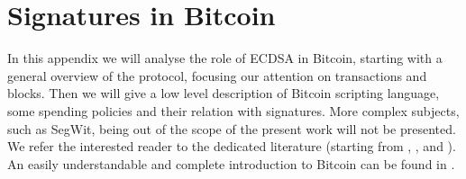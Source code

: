 \chapter{Signatures in Bitcoin}
\label{app:A}
In this appendix we will analyse the role of ECDSA in Bitcoin, starting with a general overview of the protocol, focusing our attention on transactions and blocks. Then we will give a low level description of Bitcoin scripting language, some spending policies and their relation with signatures. More complex subjects, such as SegWit, being out of the scope of the present work will not be presented. We refer the interested reader to the dedicated literature (starting from \cite{BIP1}, \cite{BIP2}, \cite{BIP3} and \cite{BIP4}). An easily understandable and complete introduction to Bitcoin can be found in \cite{RefWork:7}.

